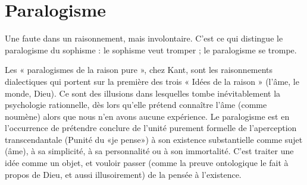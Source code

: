 \section{Paralogisme}
Une faute dans un raisonnement, mais involontaire. C’est
ce qui distingue le paralogisme du sophisme : le sophisme
veut tromper ; le paralogisme se trompe.

Les « paralogismes de la raison pure », chez Kant, sont les raisonnements
dialectiques qui portent sur la première des trois « Idées de la raison » (l’âme, le
monde, Dieu). Ce sont des illusions dans lesquelles tombe inévitablement la
psychologie rationnelle, dès lors qu’elle prétend connaître l’âme (comme noumène)
alors que nous n’en avons aucune expérience. Le paralogisme est en
l'occurrence de prétendre conclure de l’unité purement formelle de l’aperception
transcendantale (Punité du «je pense») à son existence substantielle
comme sujet (âme), à sa simplicité, à sa personnalité ou à son immortalité.
C’est traiter une idée comme un objet, et vouloir passer (comme la preuve
ontologique le fait à propos de Dieu, et aussi illusoirement) de la pensée à
l'existence.

